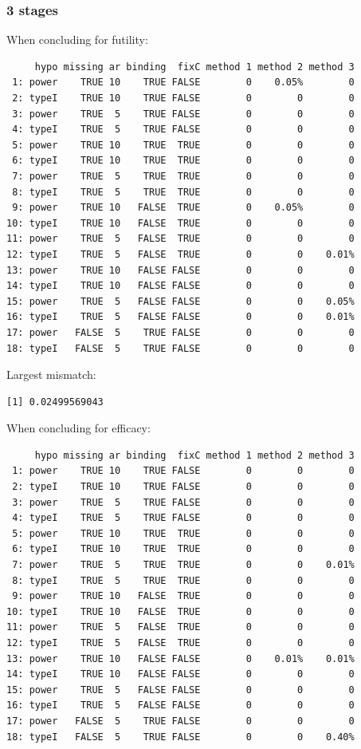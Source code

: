\documentclass[12pt]{article}
\begin{document}
\clearpage

\subsubsection{3 stages}
\label{sec:org77f7b50}

When concluding for futility:
\begin{verbatim}
     hypo missing ar binding  fixC method 1 method 2 method 3
 1: power    TRUE 10    TRUE FALSE        0    0.05%        0
 2: typeI    TRUE 10    TRUE FALSE        0        0        0
 3: power    TRUE  5    TRUE FALSE        0        0        0
 4: typeI    TRUE  5    TRUE FALSE        0        0        0
 5: power    TRUE 10    TRUE  TRUE        0        0        0
 6: typeI    TRUE 10    TRUE  TRUE        0        0        0
 7: power    TRUE  5    TRUE  TRUE        0        0        0
 8: typeI    TRUE  5    TRUE  TRUE        0        0        0
 9: power    TRUE 10   FALSE  TRUE        0    0.05%        0
10: typeI    TRUE 10   FALSE  TRUE        0        0        0
11: power    TRUE  5   FALSE  TRUE        0        0        0
12: typeI    TRUE  5   FALSE  TRUE        0        0    0.01%
13: power    TRUE 10   FALSE FALSE        0        0        0
14: typeI    TRUE 10   FALSE FALSE        0        0        0
15: power    TRUE  5   FALSE FALSE        0        0    0.05%
16: typeI    TRUE  5   FALSE FALSE        0        0    0.01%
17: power   FALSE  5    TRUE FALSE        0        0        0
18: typeI   FALSE  5    TRUE FALSE        0        0        0
\end{verbatim}

Largest mismatch:
\begin{verbatim}
[1] 0.02499569043
\end{verbatim}



When concluding for efficacy:
\begin{verbatim}
     hypo missing ar binding  fixC method 1 method 2 method 3
 1: power    TRUE 10    TRUE FALSE        0        0        0
 2: typeI    TRUE 10    TRUE FALSE        0        0        0
 3: power    TRUE  5    TRUE FALSE        0        0        0
 4: typeI    TRUE  5    TRUE FALSE        0        0        0
 5: power    TRUE 10    TRUE  TRUE        0        0        0
 6: typeI    TRUE 10    TRUE  TRUE        0        0        0
 7: power    TRUE  5    TRUE  TRUE        0        0    0.01%
 8: typeI    TRUE  5    TRUE  TRUE        0        0        0
 9: power    TRUE 10   FALSE  TRUE        0        0        0
10: typeI    TRUE 10   FALSE  TRUE        0        0        0
11: power    TRUE  5   FALSE  TRUE        0        0        0
12: typeI    TRUE  5   FALSE  TRUE        0        0        0
13: power    TRUE 10   FALSE FALSE        0    0.01%    0.01%
14: typeI    TRUE 10   FALSE FALSE        0        0        0
15: power    TRUE  5   FALSE FALSE        0        0        0
16: typeI    TRUE  5   FALSE FALSE        0        0        0
17: power   FALSE  5    TRUE FALSE        0        0        0
18: typeI   FALSE  5    TRUE FALSE        0        0    0.40%
\end{verbatim}
\end{document}
